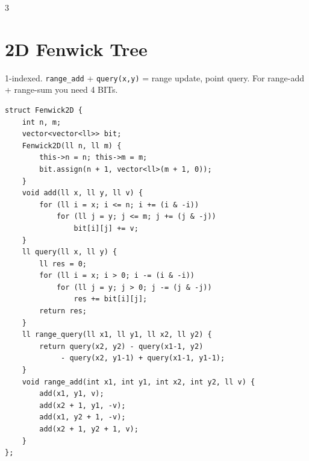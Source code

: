 \documentclass[10pt]{article}
\newcommand{\note}[1]{{\scriptsize #1}\par}
\begin{document}
\begin{multicols*}{3}
\section{2D Fenwick Tree}
\note{1-indexed. \texttt{range\_add} + \texttt{query(x,y)} = range update, point query. For range-add + range-sum you need 4 BITs.}
\begin{lstlisting}
struct Fenwick2D {
    int n, m;
    vector<vector<ll>> bit;
    Fenwick2D(ll n, ll m) {
        this->n = n; this->m = m;
        bit.assign(n + 1, vector<ll>(m + 1, 0));
    }
    void add(ll x, ll y, ll v) {
        for (ll i = x; i <= n; i += (i & -i))
            for (ll j = y; j <= m; j += (j & -j))
                bit[i][j] += v;
    }
    ll query(ll x, ll y) {
        ll res = 0;
        for (ll i = x; i > 0; i -= (i & -i))
            for (ll j = y; j > 0; j -= (j & -j))
                res += bit[i][j];
        return res;
    }
    ll range_query(ll x1, ll y1, ll x2, ll y2) {
        return query(x2, y2) - query(x1-1, y2)
             - query(x2, y1-1) + query(x1-1, y1-1);
    }
    void range_add(int x1, int y1, int x2, int y2, ll v) {
        add(x1, y1, v);
        add(x2 + 1, y1, -v);
        add(x1, y2 + 1, -v);
        add(x2 + 1, y2 + 1, v);
    }
};
\end{lstlisting}


\end{multicols*}
\end{document}
